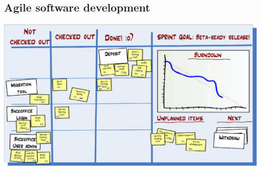 \subsection{Agile software development}
\begin{FrameWithSubSection}
    \includegraphics[width=\textwidth]{../../report/src/img/taskboard.jpg}
\end{FrameWithSubSection}

